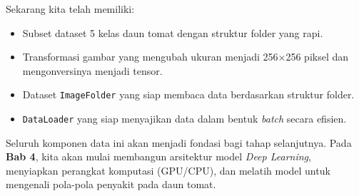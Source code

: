 Sekarang kita telah memiliki:

\begin{itemize}
    \item Subset dataset 5 kelas daun tomat dengan struktur folder yang rapi.
    \item Transformasi gambar yang mengubah ukuran menjadi 256×256 piksel dan mengonversinya menjadi tensor.
    \item Dataset \texttt{ImageFolder} yang siap membaca data berdasarkan struktur folder.
    \item \texttt{DataLoader} yang siap menyajikan data dalam bentuk \textit{batch} secara efisien.
\end{itemize}

Seluruh komponen data ini akan menjadi fondasi bagi tahap selanjutnya. Pada \textbf{Bab 4}, kita akan mulai membangun arsitektur model \textit{Deep Learning}, menyiapkan perangkat komputasi (GPU/CPU), dan melatih model untuk mengenali pola-pola penyakit pada daun tomat.
